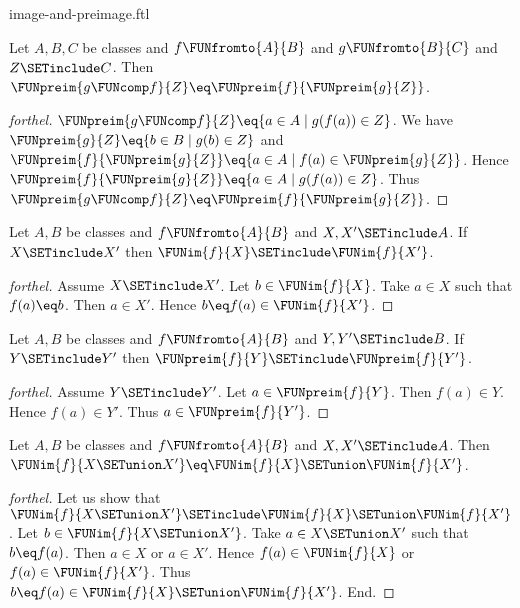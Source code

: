 \documentclass{naproche-library}
\begin{document}
\begin{smodule}[title=Computation Laws for Images and Preimages]{image-and-preimage.ftl}
\begin{proposition}[forthel,id=FOUNDATIONS_07_6824917886566400]
  Let $A, B, C$ be classes and $f \FUNfromto{A}{B}$ and $g \FUNfromto{B}{C}$ and $Z \SETinclude C$.
  Then $\FUNpreim{g \FUNcomp f}{Z} \eq \FUNpreim{f}{\FUNpreim{g}{Z}}$.
\end{proposition}
\begin{proof}[forthel]
  $\FUNpreim{g \FUNcomp f}{Z} \eq \{ a \in A \mid g(f(a)) \in Z \}$.
  We have $\FUNpreim{g}{Z} \eq \{ b \in B \mid g(b) \in Z \}$ and $\FUNpreim{f}{\FUNpreim{g}{Z}} \eq \{ a \in A \mid f(a) \in \FUNpreim{g}{Z} \}$.
  Hence $\FUNpreim{f}{\FUNpreim{g}{Z}} \eq \{ a \in A \mid g(f(a)) \in Z \}$.
  Thus $\FUNpreim{g \FUNcomp f}{Z} \eq \FUNpreim{f}{\FUNpreim{g}{Z}}$.
\end{proof}

\begin{proposition}[forthel,id=FOUNDATIONS_07_7396318576115712]
  Let $A, B$ be classes and $f \FUNfromto{A}{B}$ and $X, X' \SETinclude A$.
  If $X \SETinclude X'$ then $\FUNim{f}{X} \SETinclude \FUNim{f}{X'}$.
\end{proposition}
\begin{proof}[forthel]
  Assume $X \SETinclude X'$.
  Let $b \in \FUNim{f}{X}$.
  Take $a \in X$ such that $f(a) \eq b$.
  Then $a \in X'$.
  Hence $b \eq f(a) \in \FUNim{f}{X'}$.
\end{proof}

\begin{proposition}[forthel,id=FOUNDATIONS_07_8376448628817920]
  Let $A, B$ be classes and $f \FUNfromto{A}{B}$ and $Y, Y' \SETinclude B$.
  If $Y \SETinclude Y'$ then $\FUNpreim{f}{Y} \SETinclude \FUNpreim{f}{Y'}$.
\end{proposition}
\begin{proof}[forthel]
  Assume $Y \SETinclude Y'$.
  Let $a \in \FUNpreim{f}{Y}$.
  Then $f(a) \in Y$.
  Hence $f(a) \in Y'$.
  Thus $a \in \FUNpreim{f}{Y'}$.
\end{proof}

\begin{proposition}[forthel,id=FOUNDATIONS_07_4448961469349888]
  Let $A, B$ be classes and $f \FUNfromto{A}{B}$ and $X, X' \SETinclude A$.
  Then $\FUNim{f}{X \SETunion X'} \eq \FUNim{f}{X} \SETunion \FUNim{f}{X'}$.
\end{proposition}
\begin{proof}[forthel]
  Let us show that $\FUNim{f}{X \SETunion X'} \SETinclude \FUNim{f}{X} \SETunion \FUNim{f}{X'}$.
    Let $b \in \FUNim{f}{X \SETunion X'}$.
    Take $a \in X \SETunion X'$ such that $b \eq f(a)$.
    Then $a \in X$ or $a \in X'$.
    Hence $f(a) \in \FUNim{f}{X}$ or $f(a) \in \FUNim{f}{X'}$.
    Thus $b \eq f(a) \in \FUNim{f}{X} \SETunion \FUNim{f}{X'}$.
  End.


\end{proof}
\end{smodule}
\end{document}
